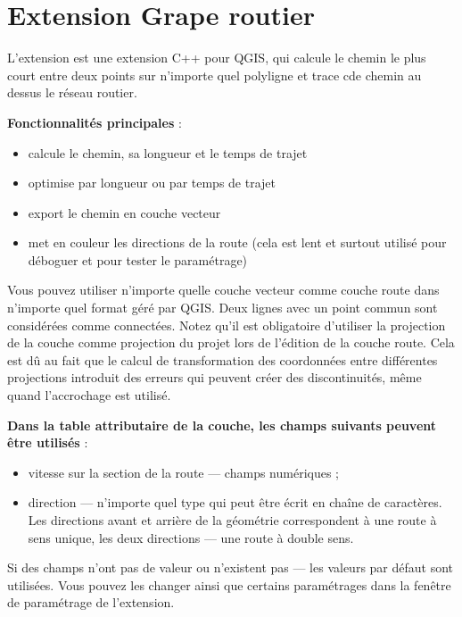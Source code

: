 
\section{Extension Grape routier}\label{sec:roadgraph}

L'extension  est une extension C++ pour QGIS, qui calcule le chemin le plus court entre deux points sur n'importe quel polyligne et trace cde chemin au dessus le réseau routier.

\textbf{Fonctionnalités principales} :

\begin{itemize}
\item calcule le chemin, sa longueur et le temps de trajet
\item optimise par longueur ou par temps de trajet
\item export le chemin en couche vecteur
\item met en couleur les directions de la route (cela est lent et surtout utilisé pour déboguer et pour tester le paramétrage)
\end{itemize}

Vous pouvez utiliser n'importe quelle couche vecteur comme couche route dans n'importe quel format géré par QGIS. Deux lignes avec un point commun sont considérées comme connectées. Notez qu'il est obligatoire d'utiliser la projection de la couche comme projection du projet lors de l'édition de la couche route. Cela est dû au fait que le calcul de transformation des coordonnées entre différentes projections introduit 
des erreurs qui peuvent créer des discontinuités, même quand l'accrochage est utilisé.

\textbf{Dans la table attributaire de la couche, les champs suivants peuvent être utilisés} :

\begin{itemize}
\item vitesse sur la section de la route — champs numériques ;
\item direction — n'importe quel type qui peut être écrit en chaîne de caractères. Les directions avant et arrière de la géométrie correspondent à une route à sens unique, les deux directions — une route à double sens.
\end{itemize}

Si des champs n'ont pas de valeur ou n'existent pas — les valeurs par défaut sont utilisées. Vous pouvez les changer ainsi que certains paramétrages dans la fenêtre de paramétrage de l'extension.

